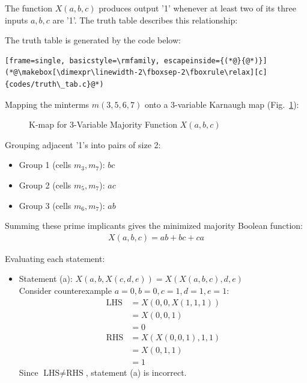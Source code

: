 \begin{enumerate}[label=\thesubsection.\arabic*, ref=\thesubsection.\theenumi]
\vspace{0.2cm}
\solution
The function $X(a,b,c)$ produces output '1' whenever at least two of its three inputs $a, b, c$ are '1'. The truth table describes this relationship:

\begin{center}

\end{center}

The truth table is generated by the code below:
\begin{lstlisting}[frame=single, basicstyle=\rmfamily, escapeinside={(*@}{@*)}]
(*@\makebox[\dimexpr\linewidth-2\fboxsep-2\fboxrule\relax][c]{codes/truth\_tab.c}@*)
\end{lstlisting}

Mapping the minterms $m(3, 5, 6, 7)$ onto a 3-variable Karnaugh map (Fig.~\ref{fig:q7_kmap}):

\begin{figure}[H]
    \centering
    
    \caption{K-map for 3-Variable Majority Function $X(a,b,c)$}
    \label{fig:q7_kmap}
\end{figure}

Grouping adjacent '1's into pairs of size 2:
\begin{itemize}
    \item Group 1 (cells $m_3, m_7$): $bc$
    \item Group 2 (cells $m_5, m_7$): $ac$
    \item Group 3 (cells $m_6, m_7$): $ab$
\end{itemize}
Summing these prime implicants gives the minimized majority Boolean function:
\begin{align}
X(a,b,c) = ab + bc + ca
\end{align}

Evaluating each statement:

\begin{itemize}
    \item Statement (a): $X(a,b,X(c,d,e)) = X(X(a,b,c),d,e)$ \\
    Consider counterexample $a=0, b=0, c=1, d=1, e=1$:
    \begin{align}
    \text{LHS} &= X(0, 0, X(1,1,1)) \\
               &= X(0, 0, 1) \\
               &= 0 \\
    \text{RHS} &= X(X(0,0,1), 1, 1) \\
               &= X(0, 1, 1) \\
               &= 1
    \end{align}
    Since $\text{LHS} \neq \text{RHS}$, statement (a) is incorrect.


\end{itemize}
\end{enumerate}
